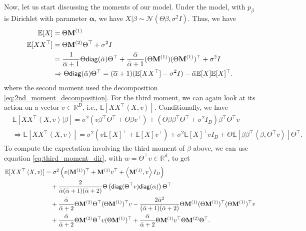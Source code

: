 \documentclass[bj,authoryear]{imsart}
\theoremstyle{plain}
\theoremstyle{remark}
\def\bM{\mathbf{M}}
\def\balpha{{\boldsymbol\alpha}}
\def\bbE{\mathbb{E}}
\def\bbR{\mathbb{R}}
\def\cN{\mathcal{N}}
\def\diag{{\sf diag}}
\newcommand{\innerprod}[1]{\left\langle#1\right\rangle}
\begin{document}
\begin{appendix}
Now, let us start discussing the moments of our model. Under the model, with $p_{\beta}$ is Dirichlet with parameter $\balpha$, we have $X|\beta \sim \cN(\Theta\beta, \sigma^2 I)$. Thus, we have
\begin{align}
    \bbE[X] &= \Theta \bM^{(1)} \\
    \bbE[XX^\top] &= \Theta \bM^{(2)}\Theta^\top + \sigma^2 I \\
    &= \frac{1}{\overline{\alpha}+1}\Theta\diag(\tilde{\alpha})\Theta^\top + \frac{\bar{\alpha}}{\bar{\alpha}+1}(\Theta\bM^{(1)})(\Theta \bM^{(1)})^\top + \sigma^2 I \nonumber\\
    &\Rightarrow \Theta \diag(\tilde{\alpha})\Theta^\top = (\overline{\alpha}+1)(\bbE[XX^\top]-\sigma^2 I) - \bar{\alpha} \bbE[X]\bbE[X]^\top. \label{eq:second_moment_dir}
\end{align}
where the second moment used the decomposition \eqref{eq:2nd_moment_decomposition}. For the third moment, we can again look at its action on a vector $v\in \bbR^D$, i.e., $\bbE[XX^\top \innerprod{X,v}]$. Conditionally, we have
\begin{align*}
    &\bbE[XX^\top\innerprod{X,v}|\beta] = \sigma^2 \left( v \beta^\top \Theta^\top + \Theta\beta v^\top\right) + \left(\Theta\beta\beta^\top\Theta^\top + \sigma^2 I_D\right) \beta^\top\Theta^\top v \\
    &\Rightarrow \bbE[XX^\top \innerprod{X,v}] = \sigma^2\left(v \bbE[X]^\top + \bbE[X]v^\top\right) + \sigma^2 \bbE[X]^\top v I_D + \Theta \bbE[\beta\beta^\top \innerprod{\beta, \Theta^\top v}]\Theta^\top.
\end{align*}
 To compute the expectation involving the third moment of $\beta$ above, we can use equation \eqref{eq:third_moment_dir}, with $w=\Theta^\top v\in\bbR^d$, to get
 \begin{align*}
     \bbE[XX^\top\innerprod{X,v}] &= \sigma^2\left(v (\bM^{(1)})^\top + \bM^{(1)}v^\top + \innerprod{\bM^{(1)}, v} I_D\right) \\
     & \quad+ \frac{2}{\bar{\alpha}(\bar{\alpha}+1)(\bar{\alpha}+2)}\Theta\left(\diag(\Theta^\top v)\diag(\alpha)\right)\Theta^\top \\
     & \quad+\frac{\bar{\alpha}}{\bar{\alpha}+2}\Theta \bM^{(2)}\Theta^\top (\Theta\bM^{(1)})^\top v - \frac{2\bar{\alpha}^2}{(\bar{\alpha}+1)(\bar{\alpha}+2)} \Theta \bM^{(1)} (\Theta\bM^{(1)})^\top (\Theta \bM^{(1)})^\top v \\
     & \quad+\frac{\bar{\alpha}}{\bar{\alpha}+2}\Theta\bM^{(2)}\Theta^\top v (\Theta\bM^{(1)})^\top + \frac{\bar{\alpha}}{\bar{\alpha}+2}\Theta \bM^{(1)} v^\top \Theta \bM^{(2)}\Theta^\top.
\end{align*}


\end{appendix}
\end{document}

